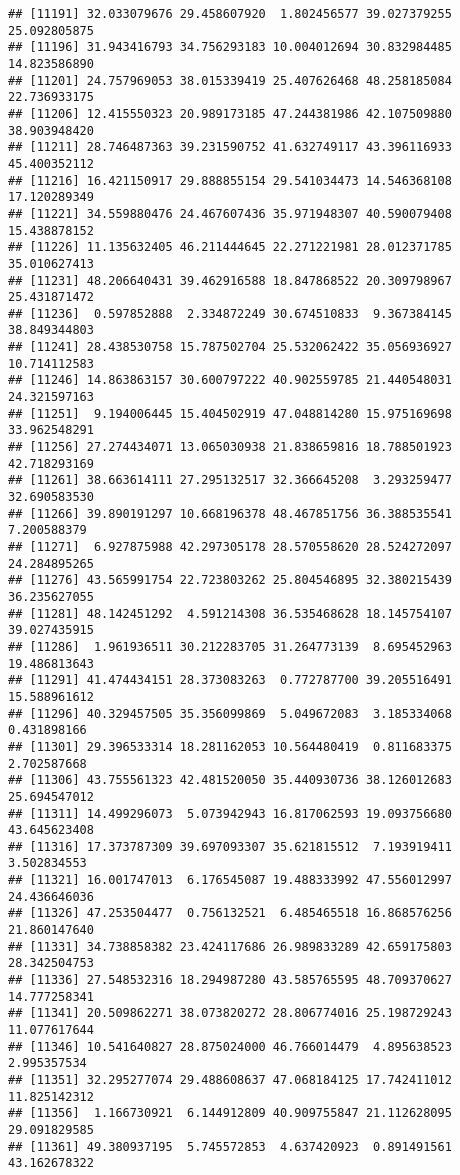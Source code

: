 \documentclass[
]{article}
\begin{document}
\begin{verbatim}
## [11191] 32.033079676 29.458607920  1.802456577 39.027379255 25.092805875
## [11196] 31.943416793 34.756293183 10.004012694 30.832984485 14.823586890
## [11201] 24.757969053 38.015339419 25.407626468 48.258185084 22.736933175
## [11206] 12.415550323 20.989173185 47.244381986 42.107509880 38.903948420
## [11211] 28.746487363 39.231590752 41.632749117 43.396116933 45.400352112
## [11216] 16.421150917 29.888855154 29.541034473 14.546368108 17.120289349
## [11221] 34.559880476 24.467607436 35.971948307 40.590079408 15.438878152
## [11226] 11.135632405 46.211444645 22.271221981 28.012371785 35.010627413
## [11231] 48.206640431 39.462916588 18.847868522 20.309798967 25.431871472
## [11236]  0.597852888  2.334872249 30.674510833  9.367384145 38.849344803
## [11241] 28.438530758 15.787502704 25.532062422 35.056936927 10.714112583
## [11246] 14.863863157 30.600797222 40.902559785 21.440548031 24.321597163
## [11251]  9.194006445 15.404502919 47.048814280 15.975169698 33.962548291
## [11256] 27.274434071 13.065030938 21.838659816 18.788501923 42.718293169
## [11261] 38.663614111 27.295132517 32.366645208  3.293259477 32.690583530
## [11266] 39.890191297 10.668196378 48.467851756 36.388535541  7.200588379
## [11271]  6.927875988 42.297305178 28.570558620 28.524272097 24.284895265
## [11276] 43.565991754 22.723803262 25.804546895 32.380215439 36.235627055
## [11281] 48.142451292  4.591214308 36.535468628 18.145754107 39.027435915
## [11286]  1.961936511 30.212283705 31.264773139  8.695452963 19.486813643
## [11291] 41.474434151 28.373083263  0.772787700 39.205516491 15.588961612
## [11296] 40.329457505 35.356099869  5.049672083  3.185334068  0.431898166
## [11301] 29.396533314 18.281162053 10.564480419  0.811683375  2.702587668
## [11306] 43.755561323 42.481520050 35.440930736 38.126012683 25.694547012
## [11311] 14.499296073  5.073942943 16.817062593 19.093756680 43.645623408
## [11316] 17.373787309 39.697093307 35.621815512  7.193919411  3.502834553
## [11321] 16.001747013  6.176545087 19.488333992 47.556012997 24.436646036
## [11326] 47.253504477  0.756132521  6.485465518 16.868576256 21.860147640
## [11331] 34.738858382 23.424117686 26.989833289 42.659175803 28.342504753
## [11336] 27.548532316 18.294987280 43.585765595 48.709370627 14.777258341
## [11341] 20.509862271 38.073820272 28.806774016 25.198729243 11.077617644
## [11346] 10.541640827 28.875024000 46.766014479  4.895638523  2.995357534
## [11351] 32.295277074 29.488608637 47.068184125 17.742411012 11.825142312
## [11356]  1.166730921  6.144912809 40.909755847 21.112628095 29.091829585
## [11361] 49.380937195  5.745572853  4.637420923  0.891491561 43.162678322

\end{verbatim}
\end{document}
